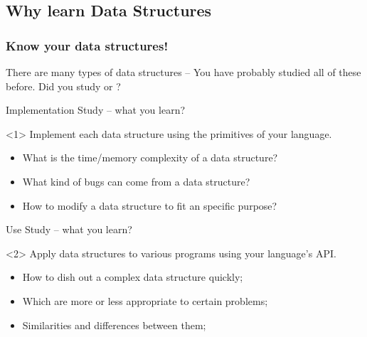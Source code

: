 \subsection{Why learn Data Structures}

\begin{frame}
  \frametitle{Know your data structures!}  There are many types of
  data structures -- You have probably studied all of these
  before. Did you study  or
  ?

  {\small
  \begin{block}{Implementation Study -- what you learn?}
    \begin{onlyenv}<1>
      Implement each data structure using the primitives of your
      language.
      \begin{itemize}
      \item What is the time/memory complexity of a data structure?
      \item What kind of bugs can come from a data structure?
      \item How to modify a data structure to fit an specific purpose?
      \end{itemize}
    \end{onlyenv}
  \end{block}

  \begin{block}{Use Study -- what you learn?}
    \begin{onlyenv}<2>
      Apply data structures to various programs using your language's
      API.
      \begin{itemize}
      \item How to dish out a complex data structure quickly;
      \item Which are more or less appropriate to certain problems;
      \item Similarities and differences between them;
      \end{itemize}
    \end{onlyenv}
  \end{block}
  }%
\end{frame}

